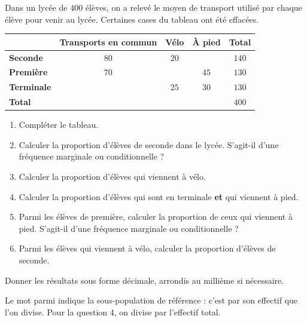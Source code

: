 \documentclass[10pt,a4paper]{article}
\begin{document}
\begin{bloc}
\begin{exo}[Guidé]
Dans un lycée de \(400\) élèves, on a relevé le moyen de transport utilisé par chaque élève pour venir au lycée. Certaines cases du tableau ont été effacées.

\begin{center}
\renewcommand{\arraystretch}{1.5}
\begin{tabular}{|l|c|c|c|c|}
    \hline
    & \textbf{Transports en commun} & \textbf{Vélo} & \textbf{À pied} & \textbf{Total} \\
    \hline
    \textbf{Seconde} & \(80\) & \(20\) & & \(140\) \\
    \hline
    \textbf{Première} & \(70\) & & \(45\) & \(130\) \\
    \hline
    \textbf{Terminale} & & \(25\) & \(30\) & \(130\) \\
    \hline
    \textbf{Total} & & & & \(400\) \\
    \hline
\end{tabular}
\end{center}

\begin{enumerate}[leftmargin=*]
    \item Compléter le tableau.
    \item Calculer la proportion d'élèves de seconde dans le lycée. S'agit-il d'une fréquence marginale ou conditionnelle ?
    \item Calculer la proportion d'élèves qui viennent à vélo.
    \item Calculer la proportion d'élèves qui sont en terminale \textbf{et} qui viennent à pied.
    \item Parmi les élèves de première, calculer la proportion de ceux qui viennent à pied. S'agit-il d'une fréquence marginale ou conditionnelle ?
    \item Parmi les élèves qui viennent à vélo, calculer la proportion d'élèves de seconde.
\end{enumerate}
Donner les résultats sous forme décimale, arrondis au millième si nécessaire.

\begin{indication}
Le mot \og parmi \fg{} indique la sous-population de référence : c'est par son effectif que l'on divise. Pour la question 4, on divise par l'effectif total.
\end{indication}

\end{exo}
\end{bloc}
\end{document}
